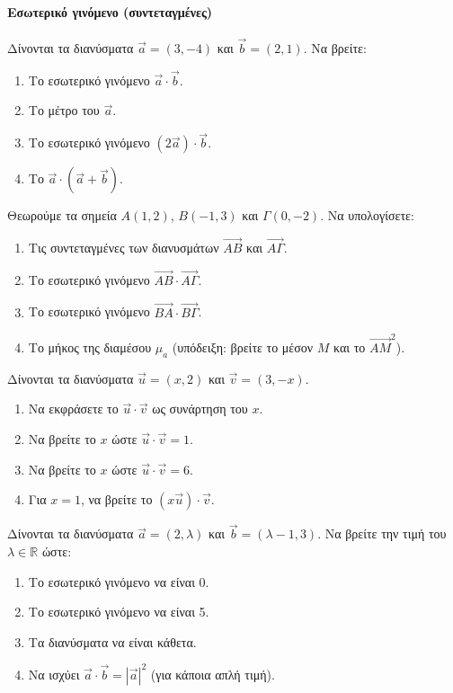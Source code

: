 \documentclass[11pt,a4paper,modern]{FFExercises}
\begin{document}
\paragraph{Εσωτερικό γινόμενο (συντεταγμένες)}

\askhsh
Δίνονται τα διανύσματα $\vec{a}=(3, -4)$ και $\vec{b}=(2, 1)$. Να βρείτε:
\begin{enumerate}
    \item Το εσωτερικό γινόμενο $\vec{a}\cdot\vec{b}$.
    \item Το μέτρο του $\vec{a}$.
    \item Το εσωτερικό γινόμενο $(2\vec{a})\cdot\vec{b}$.
    \item Το $\vec{a}\cdot(\vec{a}+\vec{b})$.
\end{enumerate}

\askhsh
Θεωρούμε τα σημεία $A(1, 2)$, $B(-1, 3)$ και $\Gamma(0, -2)$. Να υπολογίσετε:
\begin{enumerate}
    \item Τις συντεταγμένες των διανυσμάτων $\vec{AB}$ και $\vec{A\Gamma}$.
    \item Το εσωτερικό γινόμενο $\vec{AB}\cdot\vec{A\Gamma}$.
    \item Το εσωτερικό γινόμενο $\vec{BA}\cdot\vec{B\Gamma}$.
    \item Το μήκος της διαμέσου $\mu_a$ (υπόδειξη: βρείτε το μέσον $M$ και το $\vec{AM}^2$).
\end{enumerate}

\askhsh
Δίνονται τα διανύσματα $\vec{u}=(x, 2)$ και $\vec{v}=(3, -x)$.
\begin{enumerate}
    \item Να εκφράσετε το $\vec{u}\cdot\vec{v}$ ως συνάρτηση του $x$.
    \item Να βρείτε το $x$ ώστε $\vec{u}\cdot\vec{v}=1$.
    \item Να βρείτε το $x$ ώστε $\vec{u}\cdot\vec{v}=6$.
    \item Για $x=1$, να βρείτε το $(x\vec{u})\cdot\vec{v}$.
\end{enumerate}

\askhsh
Δίνονται τα διανύσματα $\vec{a}=(2, \lambda)$ και $\vec{b}=(\lambda-1, 3)$. Να βρείτε την τιμή του $\lambda \in \mathbb{R}$ ώστε:
\begin{enumerate}
    \item Το εσωτερικό γινόμενο να είναι 0.
    \item Το εσωτερικό γινόμενο να είναι 5.
    \item Τα διανύσματα να είναι κάθετα.
    \item Να ισχύει $\vec{a}\cdot\vec{b} = |\vec{a}|^2$ (για κάποια απλή τιμή).
\end{enumerate}
\end{document}
